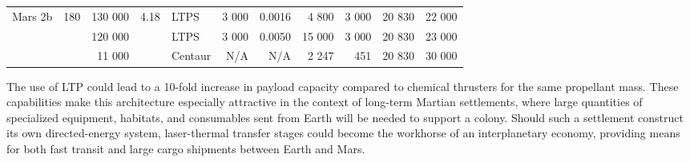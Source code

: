 \documentclass[final,3p,times,twocolumn,sort&compress, lefttitle]{elsarticle}
\begin{document}
\begin{table*}[t]
\begin{tabular}{@{}lrrrlrrrrrr@{}}
            \multirow{3}{*}{Mars 2b} & \multirow{3}{*}{180}                                      & 130 000                 & \multirow{3}{*}{4.18}                                           & LTPS                                                        & 3 000                                                    & 0.0016                                                         & 4 800                  & 3 000                 & 20 830                                                   & 22 000                                                                   \\
                                     &                                                           & 120 000                 &                                                                 & LTPS                                                        & 3 000                                                    & 0.0050                                                         & 15 000                 & 3 000                 &                     20 830                                                      & 23 000                                                                   \\
                                     &                                                           & 11 000                  &                                                                 & Centaur                                                     &  N/A                                                        &  N/A                                                              & 2 247                  & 451                   &                   20 830                                                        & 30 000                                                                   \\ \bottomrule
            \end{tabular}
            \end{table*}
        
        The use of LTP could lead to a 10-fold increase in payload capacity compared to chemical thrusters for the same propellant mass. These capabilities make this architecture especially attractive in the context of long-term Martian settlements, where large quantities of specialized equipment, habitats, and consumables sent from Earth will be needed to support a colony. Should such a settlement construct its own directed-energy system, laser-thermal transfer stages could become the workhorse of an interplanetary economy, providing means for both fast transit and large cargo shipments between Earth and Mars.
        
\end{document}
